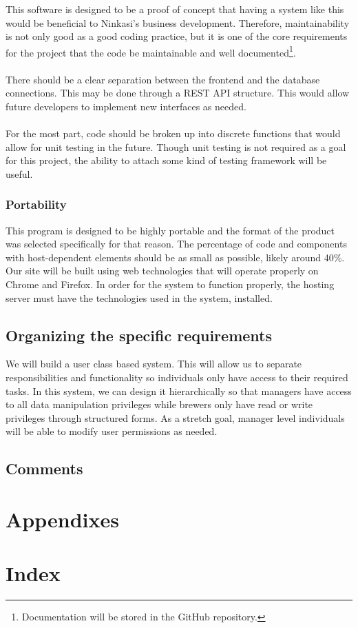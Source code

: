 \documentclass[draftclsnofoot,onecolumn,letterpaper,10pt,compsoc]{IEEEtran}
\begin{document}
		This software is designed to be a proof of concept that having a system like this would be beneficial to Ninkasi's business development.
		Therefore, maintainability is not only good as a good coding practice, but it is one of the core requirements for the project that the code be maintainable and well documented\footnote{Documentation will be stored in the GitHub repository.}.
		\\ \\
		There should be a clear separation between the frontend and the database connections.
        This may be done through a REST API structure.
        This would allow future developers to implement new interfaces as needed.
		\\ \\
		For the most part, code should be broken up into discrete functions that would allow for unit testing in the future.
		Though unit testing is not required as a goal for this project, the ability to attach some kind of testing framework will be useful.

		\subsubsection{Portability}

		This program is designed to be highly portable and the format of the product was selected specifically for that reason.
		The percentage of code and components with host-dependent elements should be as small as possible, likely around 40\%.
		Our site will be built using web technologies that will operate properly on Chrome and Firefox.
        In order for the system to function properly, the hosting server must have the technologies used in the system, installed.

	\subsection{Organizing the specific requirements}
		We will build a user class based system. 
        This will allow us to separate responsibilities and functionality so individuals only have access to their required tasks. 
        In this system, we can design it hierarchically so that managers have access to all data manipulation privileges while brewers only have read or write privileges through structured forms. 
        As a stretch goal, manager level individuals will be able to modify user permissions as needed.
	\subsection{Comments}
\section{Appendixes}
\section{Index}

\pagebreak

\end{document}
